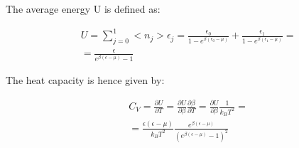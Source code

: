 \documentclass{article}
\begin{document}
The average energy U is defined as:

\begin{equation}
    \begin{aligned}
         & U=\sum_{j=0}^{1} <n_j>\epsilon_j= \frac{\epsilon_0}{1-e^{\beta(\epsilon_0-\mu)}}+\frac{\epsilon_1}{1-e^{\beta(\epsilon_1-\mu)}}= \\
         & =\frac{\epsilon}{e^{\beta(\epsilon-\mu)}-1}
    \end{aligned}
\end{equation}

The heat capacity is hence given by:

\begin{equation}
    \begin{aligned}
         & C_V=\frac{\partial U}{\partial T}= \frac{\partial U}{\partial \beta}\frac{\partial \beta}{\partial T}= \frac{\partial U}{\partial \beta}\frac{1}{k_B T^2}= \\
         & =\frac{\epsilon (\epsilon-\mu)}{k_B T^2}\frac{e^{\beta(\epsilon-\mu)}}{(e^{\beta(\epsilon-\mu)}-1)^2}
    \end{aligned}
\end{equation}
\end{document}

